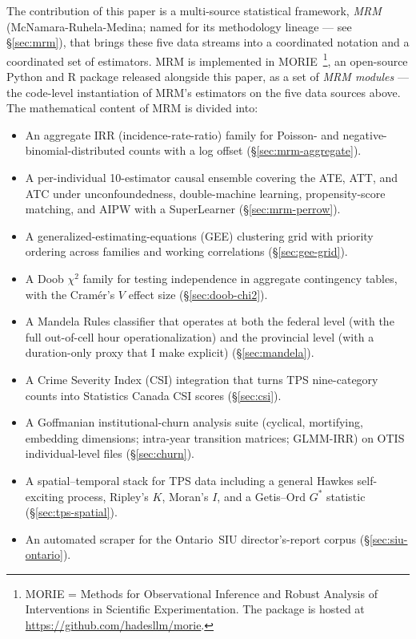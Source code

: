 \documentclass[11pt,a4paper]{article}
\theoremstyle{plain}
\theoremstyle{definition}
\theoremstyle{remark}
\begin{document}
The contribution of this paper is a multi-source statistical
framework, \emph{MRM} (McNamara-Ruhela-Medina; named for its
methodology lineage --- see \S\ref{sec:mrm}), that brings these
five data streams into a coordinated notation and a coordinated
set of estimators. MRM is implemented in
MORIE~\cite{Ruhela2026MORIE}\footnote{MORIE = Methods for
Observational Inference and Robust Analysis of Interventions in
Scientific Experimentation. The package is hosted at
\url{https://github.com/hadesllm/morie}.}, an open-source Python
and R package released alongside this paper, as a set of \emph{MRM
modules} --- the code-level instantiation of MRM's estimators on
the five data sources above.
The mathematical content of MRM is divided into:
\begin{itemize}
  \item An aggregate IRR (incidence-rate-ratio) family for
        Poisson- and negative-binomial-distributed counts with a
        log offset (\S\ref{sec:mrm-aggregate}).
  \item A per-individual 10-estimator causal ensemble covering
        the ATE, ATT, and ATC under unconfoundedness, double-machine
        learning, propensity-score matching, and AIPW with a
        SuperLearner (\S\ref{sec:mrm-perrow}).
  \item A generalized-estimating-equations (GEE) clustering grid
        with priority ordering across families and working
        correlations (\S\ref{sec:gee-grid}).
  \item A Doob $\chi^{2}$ family for testing independence in
        aggregate contingency tables, with the Cram\'{e}r's $V$
        effect size (\S\ref{sec:doob-chi2}).
  \item A Mandela Rules classifier that operates at both the
        federal level (with the full out-of-cell hour
        operationalization) and the provincial level (with a
        duration-only proxy that I make explicit)
        (\S\ref{sec:mandela}).
  \item A Crime Severity Index (CSI) integration that turns TPS
        nine-category counts into Statistics Canada CSI scores
        (\S\ref{sec:csi}).
  \item A Goffmanian institutional-churn analysis suite
        (cyclical, mortifying, embedding dimensions; intra-year
        transition matrices; GLMM-IRR) on OTIS individual-level
        files (\S\ref{sec:churn}).
  \item A spatial--temporal stack for TPS data including a
        general Hawkes self-exciting process, Ripley's $K$,
        Moran's $I$, and a Getis--Ord $G^{\ast}$ statistic
        (\S\ref{sec:tps-spatial}).
  \item An automated scraper for the Ontario~SIU
        director's-report corpus (\S\ref{sec:siu-ontario}).
\end{itemize}
\end{document}
